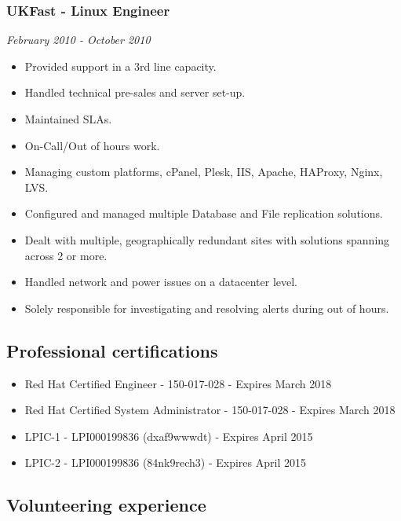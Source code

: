 \subsubsection{UKFast - Linux Engineer}\label{ukfast---linux-engineer}

\emph{February 2010 - October 2010}

\begin{itemize}
\itemsep1pt\parskip0pt
\item
  Provided support in a 3rd line capacity.
\item
  Handled technical pre-sales and server set-up.
\item
  Maintained SLAs.
\item
  On-Call/Out of hours work.
\item
  Managing custom platforms, cPanel, Plesk, IIS, Apache, HAProxy, Nginx,
  LVS.
\item
  Configured and managed multiple Database and File replication
  solutions.
\item
  Dealt with multiple, geographically redundant sites with solutions
  spanning across 2 or more.
\item
  Handled network and power issues on a datacenter level.
\item
  Solely responsible for investigating and resolving alerts during out
  of hours.
\end{itemize}

\subsection{Professional
certifications}\label{professional-certifications}

\begin{itemize}
\itemsep1pt\parskip0pt
\item
  Red Hat Certified Engineer - 150-017-028 - Expires March 2018
\item
  Red Hat Certified System Administrator - 150-017-028 - Expires March
  2018
\item
  LPIC-1 - LPI000199836 (dxaf9wwwdt) - Expires April 2015
\item
  LPIC-2 - LPI000199836 (84nk9rech3) - Expires April 2015
\end{itemize}

\subsection{Volunteering experience}\label{volunteering-experience}

